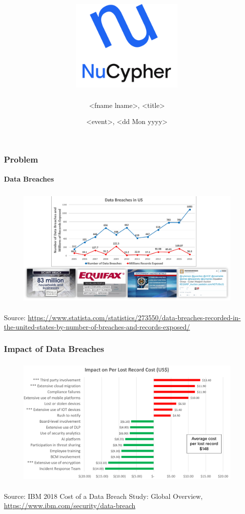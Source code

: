 \documentclass[xetex,mathsans,sans,aspectratio=169]{beamer}
\title[NuCypher]{\includegraphics[width=5.5cm]{pdf/nucypher_logo.pdf}}
\author[<fname>]{<fname lname>, <title>}
\date[<dd Mon yyyy>]{<event>, <dd Mon yyyy>}
\begin{document}
    \begin{frame}
        \titlepage
    \end{frame}

    \begin{frame}
      \frametitle{Problem}
      \framesubtitle{Data Breaches}
        \begin{figure}
            \centering
            \includegraphics[height=6cm]{pdf/data-breaches.pdf}
        \end{figure}

        {\tiny Source: \url{https://www.statista.com/statistics/273550/data-breaches-recorded-in-the-united-states-by-number-of-breaches-and-records-exposed/} \par}
    \end{frame}

    \begin{frame}
      \frametitle{Impact of Data Breaches}
        \begin{figure}
            \centering
            \includegraphics[height=6.5cm]{pdf/impact-of-data-breaches.pdf}
        \end{figure}

        {\tiny Source: IBM 2018 Cost of a Data Breach Study: Global Overview, \url{https://www.ibm.com/security/data-breach} \par}
    \end{frame}
\end{document}
